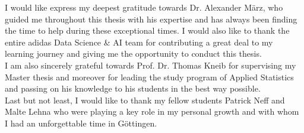 
\vspace{3cm}



I would like express my deepest gratitude towards Dr. Alexander März, who guided me throughout this thesis with his expertise and has always been finding the time to help during these exceptional times. I would also like to thank the entire adidas Data Science \& AI team for contributing a great deal to my learning journey and giving me the opportunity to conduct this thesis.\\
I am also sincerely grateful towards Prof. Dr. Thomas Kneib for supervising my Master thesis and moreover for leading the study program of Applied Statistics and passing on his knowledge to his students in the best way possible.\\
Last but not least, I would like to thank my fellow students Patrick Neff and Malte Lehna who were playing a key role in my personal growth and with whom I had an unforgettable time in Göttingen. 

\vspace{1.5cm}


\textbf{}


